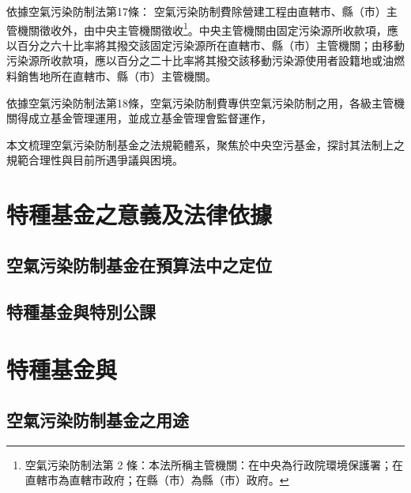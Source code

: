 \documentclass[12pt,a4paper]{article}
\begin{document}
依據空氣污染防制法第17條：
空氣污染防制費除營建工程由直轄市、縣（市）主管機關徵收外，由中央主管機關徵收\footnote{空氣污染防制法第 2 條：本法所稱主管機關：在中央為行政院環境保護署；在直轄市為直轄市政府；在縣（市）為縣（巿）政府。}。中央主管機關由固定污染源所收款項，應以百分之六十比率將其撥交該固定污染源所在直轄市、縣（市）主管機關；由移動污染源所收款項，應以百分之二十比率將其撥交該移動污染源使用者設籍地或油燃料銷售地所在直轄市、縣（市）主管機關。

依據空氣污染防制法第18條，空氣污染防制費專供空氣污染防制之用，各級主管機關得成立基金管理運用，並成立基金管理會監督運作，


本文梳理空氣污染防制基金之法規範體系，聚焦於中央空污基金，探討其法制上之規範合理性與目前所遇爭議與困境。



\section{特種基金之意義及法律依據}

\subsection{空氣污染防制基金在預算法中之定位}


\subsection{特種基金與特別公課}



\section{特種基金與}


\pagebreak

\subsection{空氣污染防制基金之用途}
\end{document}
